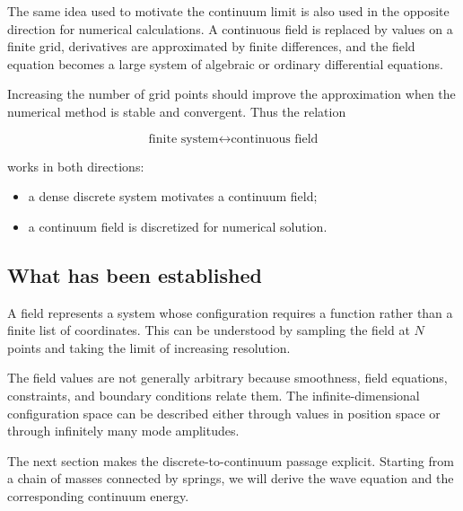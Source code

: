 The same idea used to motivate the continuum limit is also used in the opposite direction for numerical calculations. A continuous field is replaced by values on a finite grid, derivatives are approximated by finite differences, and the field equation becomes a large system of algebraic or ordinary differential equations.

Increasing the number of grid points should improve the approximation when the numerical method is stable and convergent. Thus the relation

\[
\text{finite system}
\longleftrightarrow
\text{continuous field}
\]

works in both directions:

\begin{itemize}
    \item a dense discrete system motivates a continuum field;
    \item a continuum field is discretized for numerical solution.
\end{itemize}

\subsection{What has been established}

A field represents a system whose configuration requires a function rather than a finite list of coordinates. This can be understood by sampling the field at \(N\) points and taking the limit of increasing resolution.

The field values are not generally arbitrary because smoothness, field equations, constraints, and boundary conditions relate them. The infinite-dimensional configuration space can be described either through values in position space or through infinitely many mode amplitudes.

The next section makes the discrete-to-continuum passage explicit. Starting from a chain of masses connected by springs, we will derive the wave equation and the corresponding continuum energy.